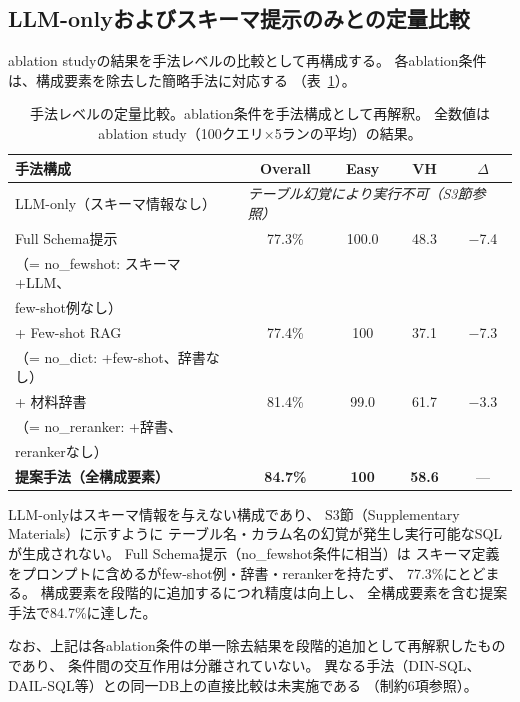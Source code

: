 \documentclass[5p,twocolumn]{elsarticle}
\begin{document}
\subsection{LLM-onlyおよびスキーマ提示のみとの定量比較}

ablation studyの結果を手法レベルの比較として再構成する。
各ablation条件は、構成要素を除去した簡略手法に対応する
（表~\ref{tab:method_comparison}）。

\begin{table}[t]
\centering
\caption{手法レベルの定量比較。ablation条件を手法構成として再解釈。
全数値はablation study（100クエリ×5ランの平均）の結果。}
\label{tab:method_comparison}
\small
\begin{tabular}{@{}p{4.2cm}cccc@{}}
\toprule
手法構成 & Overall & Easy & VH & $\Delta$ \\
\midrule
LLM-only（スキーマ情報なし） & \multicolumn{4}{l}{\textit{テーブル幻覚により実行不可（S3節参照）}} \\
\midrule
Full Schema提示 & 77.3\% & 100.0 & 48.3 & $-$7.4  \\
{\scriptsize （= no\_fewshot: スキーマ+LLM、} & & & & \\
{\scriptsize \phantom{（= }few-shot例なし）} & & & & \\
\midrule
+ Few-shot RAG & 77.4\% & 100 & 37.1 & $-$7.3 \\
{\scriptsize （= no\_dict: +few-shot、辞書なし）} & & & & \\
\midrule
+ 材料辞書 & 81.4\% & 99.0 & 61.7 & $-$3.3 \\
{\scriptsize （= no\_reranker: +辞書、} & & & & \\
{\scriptsize \phantom{（= }rerankerなし）} & & & & \\
\midrule
\textbf{提案手法（全構成要素）} & \textbf{84.7\%} & \textbf{100} & \textbf{58.6} & --- \\
\bottomrule
\end{tabular}
\end{table}

LLM-onlyはスキーマ情報を与えない構成であり、
S3節（Supplementary Materials）に示すように
テーブル名・カラム名の幻覚が発生し実行可能なSQLが生成されない。
Full Schema提示（no\_fewshot条件に相当）は
スキーマ定義をプロンプトに含めるがfew-shot例・辞書・rerankerを持たず、
77.3\%にとどまる。
構成要素を段階的に追加するにつれ精度は向上し、
全構成要素を含む提案手法で84.7\%に達した。

なお、上記は各ablation条件の単一除去結果を段階的追加として再解釈したものであり、
条件間の交互作用は分離されていない。
異なる手法（DIN-SQL、DAIL-SQL等）との同一DB上の直接比較は未実施である
（制約6項参照）。
\end{document}
